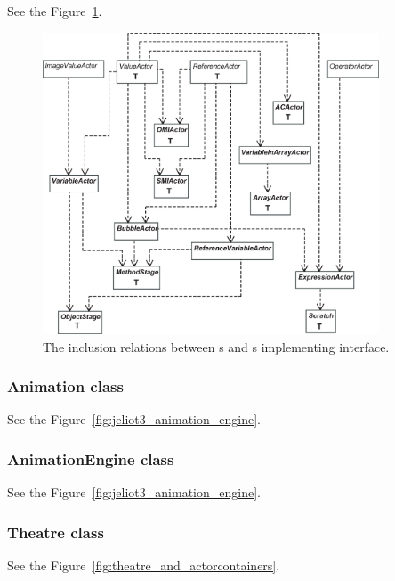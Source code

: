 See the Figure~\ref{fig:actors_and_actorcontainers}.

\begin{figure}[!htb]
\begin{center}
\includegraphics[width=10cm]{images/actorcontainers_and_actors.eps}
\caption{The inclusion relations between s and s implementing  interface.}
\label{fig:actors_and_actorcontainers}
\end{center}
\end{figure}

\subsubsection{Animation class}

See the Figure~\ref{fig:jeliot3_animation_engine}.

\subsubsection{AnimationEngine class}

See the Figure~\ref{fig:jeliot3_animation_engine}.

\subsubsection{Theatre class}

See the Figure~\ref{fig:theatre_and_actorcontainers}.

